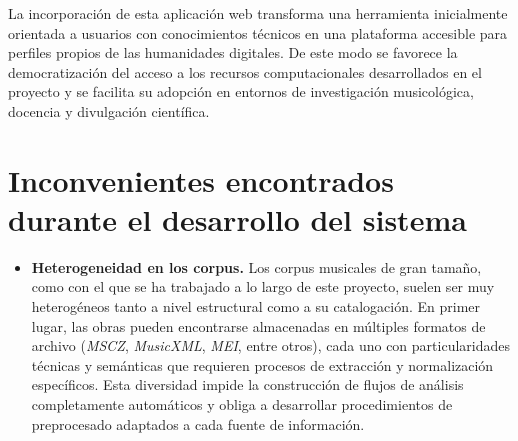 La incorporación de esta aplicación web transforma una herramienta inicialmente orientada a usuarios con conocimientos técnicos en una plataforma accesible para perfiles propios de las humanidades digitales. De este modo se favorece la democratización del acceso a los recursos computacionales desarrollados en el proyecto y se facilita su adopción en entornos de investigación musicológica, docencia y divulgación científica.

\section{Inconvenientes encontrados durante el desarrollo del sistema}
\begin{itemize}
\item \textbf{Heterogeneidad en los corpus.} Los corpus musicales de gran tamaño, como con el que se ha trabajado a lo largo de este proyecto, suelen ser muy heterogéneos tanto a nivel estructural como a su catalogación. En primer lugar, las obras pueden encontrarse almacenadas en múltiples formatos de archivo (\textit{MSCZ}, \textit{MusicXML}, \textit{MEI}, entre otros), cada uno con particularidades técnicas y semánticas que requieren procesos de extracción y normalización específicos. Esta diversidad impide la construcción de flujos de análisis completamente automáticos y obliga a desarrollar procedimientos de preprocesado adaptados a cada fuente de información.


\end{itemize}

